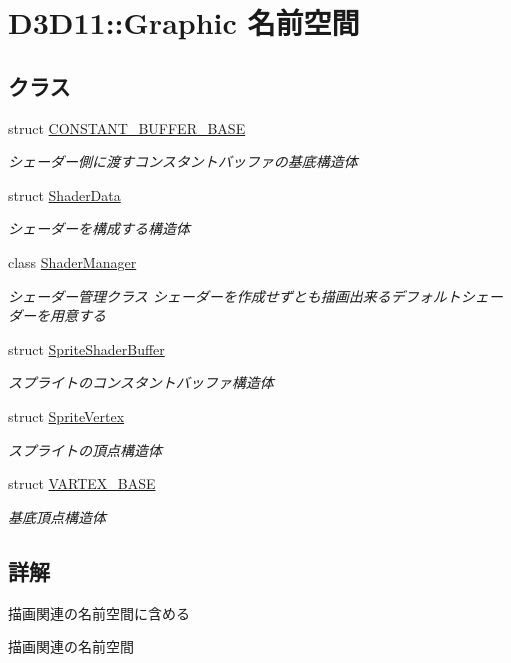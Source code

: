 \hypertarget{namespace_d3_d11_1_1_graphic}{}\section{D3\+D11\+:\+:Graphic 名前空間}
\label{namespace_d3_d11_1_1_graphic}
\subsection*{クラス}
\begin{DoxyCompactItemize}
\item 
struct \hyperlink{struct_d3_d11_1_1_graphic_1_1_c_o_n_s_t_a_n_t___b_u_f_f_e_r___b_a_s_e}{C\+O\+N\+S\+T\+A\+N\+T\+\_\+\+B\+U\+F\+F\+E\+R\+\_\+\+B\+A\+SE}
\begin{DoxyCompactList}\small\item\em シェーダー側に渡すコンスタントバッファの基底構造体 \end{DoxyCompactList}\item 
struct \hyperlink{struct_d3_d11_1_1_graphic_1_1_shader_data}{Shader\+Data}
\begin{DoxyCompactList}\small\item\em シェーダーを構成する構造体 \end{DoxyCompactList}\item 
class \hyperlink{class_d3_d11_1_1_graphic_1_1_shader_manager}{Shader\+Manager}
\begin{DoxyCompactList}\small\item\em シェーダー管理クラス  シェーダーを作成せずとも描画出来るデフォルトシェーダーを用意する \end{DoxyCompactList}\item 
struct \hyperlink{struct_d3_d11_1_1_graphic_1_1_sprite_shader_buffer}{Sprite\+Shader\+Buffer}
\begin{DoxyCompactList}\small\item\em スプライトのコンスタントバッファ構造体 \end{DoxyCompactList}\item 
struct \hyperlink{struct_d3_d11_1_1_graphic_1_1_sprite_vertex}{Sprite\+Vertex}
\begin{DoxyCompactList}\small\item\em スプライトの頂点構造体 \end{DoxyCompactList}\item 
struct \hyperlink{struct_d3_d11_1_1_graphic_1_1_v_a_r_t_e_x___b_a_s_e}{V\+A\+R\+T\+E\+X\+\_\+\+B\+A\+SE}
\begin{DoxyCompactList}\small\item\em 基底頂点構造体 \end{DoxyCompactList}\end{DoxyCompactItemize}


\subsection{詳解}
描画関連の名前空間に含める

描画関連の名前空間 